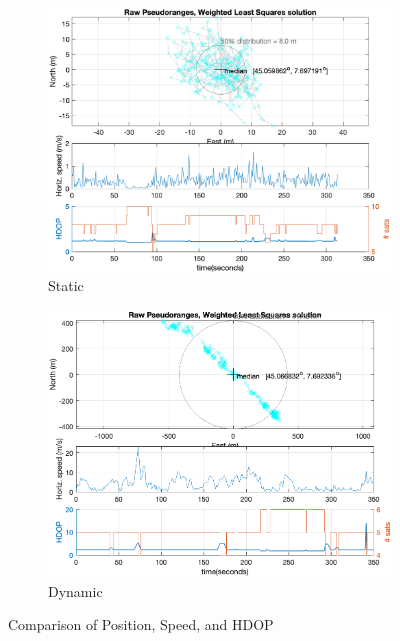         \begin{figure}[h!]
            \centering
            \begin{subfigure}{0.23\textwidth}
                \includegraphics[width=\textwidth]{images/tests/Monte_Cappuccini/png/Samsung_A51_Monte_Cappuccini_fig4.png}
                \caption{Static}
                \label{fig:Position_Speed_a}
            \end{subfigure}
            \hfill
            \begin{subfigure}{0.23\textwidth}
                \includegraphics[width=\textwidth]{images/tests/Tram_15_trip_Castello_to_Pescatore/filtered/Samsung_A51_Tram_15_trip_Castello_to_Pescatore_fig4.png}
                \caption{Dynamic}
                \label{fig:Position_Speed_b}
            \end{subfigure}
            \vspace{0.35cm}
            \caption{Comparison of Position, Speed, and HDOP}
            \label{fig:position_speed_comparison}
        \end{figure}
    
